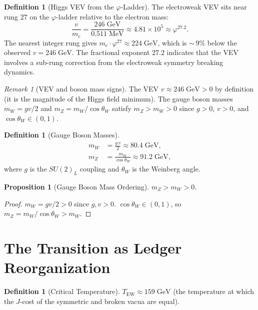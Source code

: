 \documentclass[12pt,a4paper]{article}
\newtheorem{proposition}[theorem]{Proposition}
\theoremstyle{definition}
\newtheorem{definition}[theorem]{Definition}
\theoremstyle{remark}
\newtheorem{remark}[theorem]{Remark}
\begin{document}
\begin{definition}[Higgs VEV from the $\varphi$-Ladder]
The electroweak VEV sits near rung 27 on the $\varphi$-ladder
relative to the electron mass:
\begin{equation}
  \frac{v}{m_e} = \frac{246\;\mathrm{GeV}}{0.511\;\mathrm{MeV}}
  \approx 4.81 \times 10^5 \approx \varphi^{27.2}.
\end{equation}
The nearest integer rung gives $m_e \cdot \varphi^{27} \approx
224\;\mathrm{GeV}$, which is ${\sim}\,9\%$ below the observed
$v = 246\;\mathrm{GeV}$.  The fractional exponent
$27.2$ indicates that the VEV involves a sub-rung correction
from the electroweak symmetry breaking dynamics.
\end{definition}

\begin{remark}[VEV and boson mass signs]
The VEV $v \approx 246\;\mathrm{GeV} > 0$ by definition (it is
the magnitude of the Higgs field minimum).  The gauge boson masses
$m_W = gv/2$ and $m_Z = m_W/\cos\theta_W$ satisfy $m_Z > m_W > 0$
since $g>0$, $v>0$, and $\cos\theta_W \in (0,1)$.
\end{remark}

\begin{definition}[Gauge Boson Masses]
\begin{align}
  m_W &= \frac{g\,v}{2} \approx 80.4\;\mathrm{GeV}, \\
  m_Z &= \frac{m_W}{\cos\theta_W} \approx 91.2\;\mathrm{GeV},
\end{align}
where $g$ is the $SU(2)_L$ coupling and $\theta_W$ is the Weinberg
angle.
\end{definition}

\begin{proposition}[Gauge Boson Mass Ordering]
$m_Z > m_W > 0$.
\end{proposition}

\begin{proof}
$m_W = gv/2 > 0$ since $g,v > 0$.  $\cos\theta_W \in (0,1)$, so
$m_Z = m_W/\cos\theta_W > m_W$.
\end{proof}

\section{The Transition as Ledger Reorganization}
\label{sec:transition}

\begin{definition}[Critical Temperature]
$T_{\mathrm{EW}} \approx 159\;\mathrm{GeV}$ (the temperature at
which the $J$-cost of the symmetric and broken vacua are equal).
\end{definition}
\end{document}
